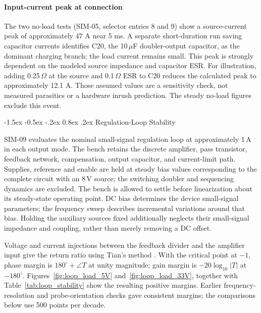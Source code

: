 \documentclass[conference]{IEEEtran}
\makeatletter
\renewcommand\subsection{\@startsection{subsection}{2}{\z@}%
  {-1.5ex \@plus -0.5ex \@minus -.2ex}%
  {0.8ex \@plus .2ex}%
  {\normalfont\sffamily\normalsize\bfseries}}
\makeatother
\begin{document}
\paragraph{Input-current peak at connection}
The two no-load tests (SIM-05, selector entries 8 and 9) show a
source-current peak of approximately 47 A near 5 ms. A separate
short-duration run saving capacitor currents identifies C20, the
10\,$\mu$F doubler-output capacitor, as the dominant charging branch;
the load current remains small. This peak is strongly dependent on
the modeled source impedance and capacitor ESR. For illustration,
adding 0.25\,$\Omega$ at the source and 0.1\,$\Omega$ ESR to C20
reduces the calculated peak to approximately 12.1 A. Those assumed
values are a sensitivity check, not measured parasitics or a hardware
inrush prediction. The steady no-load figures exclude this event.

\subsection{Regulation-Loop Stability}

SIM-09 evaluates the nominal small-signal regulation loop at
approximately \(1\,\mathrm{A}\) in each output mode. The bench
retains the discrete amplifier, pass transistor, feedback network,
compensation, output capacitor, and current-limit path. Supplies,
reference and enable are held at steady bias values corresponding
to the complete circuit with an \(8\,\mathrm{V}\) source;
the switching doubler and sequencing dynamics are excluded.
The bench is allowed to settle before linearization about its steady-state operating point. DC bias determines the device small-signal parameters; the frequency sweep describes incremental variations around that bias. Holding the auxiliary sources fixed additionally neglects their small-signal impedance and coupling, rather than merely removing a DC offset.

Voltage and current injections between the feedback divider and
the amplifier input give the return ratio using Tian's method
\cite{tian_stability_2001}. With the critical point at \(-1\),
phase margin is \(180^{\circ}+\angle T\) at unity magnitude;
gain margin is \(-20\log_{10}|T|\) at \(-180^{\circ}\).
Figures~\ref{fig:loop_load_5V} and~\ref{fig:loop_load_33V}, together with
Table~\ref{tab:loop_stability} show the resulting positive margins.
Earlier frequency-resolution and probe-orientation checks gave
consistent margins; the comparisons below use 500 points per decade.
\end{document}
